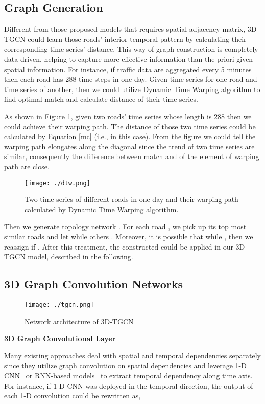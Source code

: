 \documentclass{article}
\begin{document}
\subsection{Graph Generation}
Different from those proposed models that requires spatial adjacency matrix, 3D-TGCN could learn those roads' interior temporal pattern by calculating their corresponding time series' distance. This way of graph construction is completely data-driven, helping to capture more effective information than the priori given spatial information. For instance, if traffic data are aggregated every 5 minutes then each road has 288 time steps in one day. Given time series  for one road and time series  of another, then we could utilize Dynamic Time Warping algorithm to find optimal match and calculate distance of their time series.

As shown in Figure \ref{fig:dtw}, given two roads' time series whose length is 288 then we could achieve their warping path. The distance of those two time series could be calculated by Equation \ref{mc} (i.e.,  in this case). From the figure we could tell the warping path elongates along the diagonal since the trend of two time series are similar, consequently the difference between match  and  of the element  of warping path  are close.
 \begin{figure}
\centering
\texttt{[image: ./dtw.png]}
 \caption{\label{fig:dtw}Two time series of different roads in one day and their warping path calculated by Dynamic Time Warping algorithm.}
 \end{figure}

Then we generate topology network . For each road , we pick up its top  most similar roads  and let  while others . Moreover, it is possible that  while , then we reassign  if . After this treatment, the constructed  could be applied in our 3D-TGCN model, described in the following.

\subsection{3D Graph Convolution Networks}

\begin{figure*}[ht!]
\centering
\texttt{[image: ./tgcn.png]}
\caption{\label{fig:tgcn}  Network architecture of 3D-TGCN}
\end{figure*}

\textbf{3D Graph Convolutional Layer}

Many existing approaches deal with  spatial and temporal dependencies separately since they utilize graph convolution on spatial dependencies and leverage 1-D CNN~\cite{yuspatio} or RNN-based models~\cite{li2018diffusion} to extract temporal dependency along time axis. For instance, if 1-D CNN was deployed in the temporal direction, the output of each 1-D convolution could be rewritten as,
\end{document}
